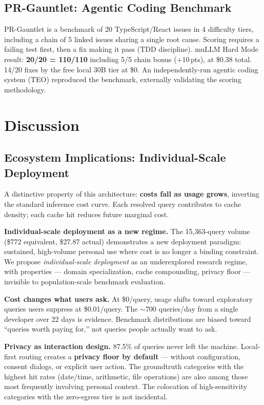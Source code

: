 \documentclass[11pt]{article}
\begin{document}
\subsection{PR-Gauntlet: Agentic Coding Benchmark}

PR-Gauntlet is a benchmark of 20 TypeScript/React issues in 4 difficulty
tiers, including a chain of 5 linked issues sharing a single root cause.
Scoring requires a failing test first, then a fix making it pass (TDD
discipline). muLLM Hard Mode result: \textbf{20/20 = 110/110} including
5/5 chain bonus (+10\,pts), at \$0.38 total. 14/20 fixes by the free
local 30B tier at \$0. An independently-run agentic coding system (TEO)
reproduced the benchmark, externally validating the scoring methodology.

\section{Discussion}

\subsection{Ecosystem Implications: Individual-Scale Deployment}

A distinctive property of this architecture: \textbf{costs fall as usage
grows}, inverting the standard inference cost curve. Each resolved query
contributes to cache density; each cache hit reduces future marginal
cost.

\textbf{Individual-scale deployment as a new regime.} The 15,363-query
volume (\$772 equivalent, \$27.87 actual) demonstrates a new deployment
paradigm: sustained, high-volume personal use where cost is no longer a
binding constraint. We propose \textit{individual-scale deployment} as an
underexplored research regime, with properties --- domain specialization,
cache compounding, privacy floor --- invisible to population-scale
benchmark evaluation.

\textbf{Cost changes what users ask.} At \$0/query, usage shifts toward
exploratory queries users suppress at \$0.01/query. The $\sim$700
queries/day from a single developer over 22 days is evidence. Benchmark
distributions are biased toward ``queries worth paying for,'' not queries
people actually want to ask.

\textbf{Privacy as interaction design.} 87.5\% of queries never left the
machine. Local-first routing creates a \textbf{privacy floor by default}
--- without configuration, consent dialogs, or explicit user action. The
groundtruth categories with the highest hit rates (date/time, arithmetic,
file operations) are also among those most frequently involving personal
context. The colocation of high-sensitivity categories with the
zero-egress tier is not incidental.
\end{document}
